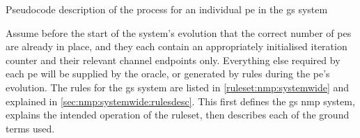 \begin{algorithm}
\DontPrintSemicolon
{}
\caption[Pseudocode of the  process in the \gls{gs} system]{\label{alg:nmp:systemwide2}Pseudocode description of the process for an individual \gls{pe} in the \gls{gs} system}
\end{algorithm}

Assume before the start of the system's evolution that the correct number of \glspl{pe} are already in place, and they each contain an appropriately initialised iteration counter and their relevant channel endpoints only.  Everything else required by each \gls{pe} will be supplied by the oracle, or generated by rules during the \gls{pe}'s evolution.  The rules for the \gls{gs} system are listed in \cref{ruleset:nmp:systemwide} and explained in \cref{sec:nmp:systemwide:rulesdesc}.  This  first defines the \gls{gs} \gls{nmp} system, explains the intended operation of the \gls{ruleset}, then describes each of the ground terms used.

